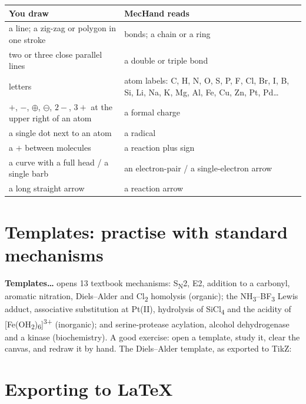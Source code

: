 \documentclass[11pt,a4paper]{article}
\newcommand{\btn}[1]{\textsf{\textbf{#1}}}
\begin{document}
\begin{center}
\begin{tabularx}{\linewidth}{@{}lX@{}}
  \toprule
  You draw & MecHand reads \\
  \midrule
  a line; a zig-zag or polygon in one stroke & bonds; a chain or a ring \\
  two or three close parallel lines & a double or triple bond \\
  letters & atom labels: C, H, N, O, S, P, F, Cl, Br, I, B, Si, Li, Na, K, Mg, Al, Fe, Cu, Zn, Pt, Pd\ldots \\
  $+$, $-$, $\oplus$, $\ominus$, $2-$, $3+$ at the upper right of an atom & a formal charge \\
  a single dot next to an atom & a radical \\
  a $+$ between molecules & a reaction plus sign \\
  a curve with a full head / a single barb & an electron-pair / a single-electron arrow \\
  a long straight arrow & a reaction arrow \\
  \bottomrule
\end{tabularx}
\end{center}

\section{Templates: practise with standard mechanisms}

\btn{Templates\ldots} opens 13 textbook mechanisms: S\textsubscript{N}2, E2, addition to a carbonyl,
aromatic nitration, Diels--Alder and Cl\textsubscript{2} homolysis (organic); the NH\textsubscript{3}--BF\textsubscript{3}
Lewis adduct, associative substitution at Pt(II), hydrolysis of SiCl\textsubscript{4} and the acidity of
[Fe(OH\textsubscript{2})\textsubscript{6}]\textsuperscript{3+} (inorganic); and serine-protease acylation,
alcohol dehydrogenase and a kinase (biochemistry). A good exercise: open a template, study it, clear
the canvas, and redraw it by hand. The Diels--Alder template, as exported to TikZ:

\begin{center}
  
\end{center}

\section{Exporting to \LaTeX{}}
\end{document}
